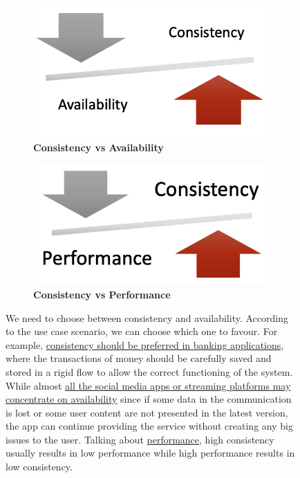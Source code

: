 \documentclass[10pt,a4paper]{article}
\begin{document}
\begin{figure}[h!]
\centering
\begin{subfigure}{.5\textwidth}
  \centering
  \includegraphics[width=.5\linewidth]{images/availability-vs-consistency}
  \caption{\textbf{Consistency vs Availability}}
  \label{fig:ca}
\end{subfigure}%
\begin{subfigure}{.5\textwidth}
  \centering
  \includegraphics[width=.5\linewidth]{images/performance-vs-consistency}
  \caption{\textbf{Consistency vs Performance}}
  \label{fig:cp}
\end{subfigure}
\caption{We need to choose between consistency and availability. According to the use case scenario, we can choose which one to favour. For example, \uline{consistency should be preferred in banking applications}, where the transactions of money should be carefully saved and stored in a rigid flow to allow the correct functioning of the system. While almost \uline{all the social media apps or streaming platforms may concentrate on availability} since if some data in the communication is lost or some user content are not presented in the latest version, the app can continue providing the service without creating any big issues to the user. Talking about \uline{performance}, high consistency usually results in low performance while high performance results in low consistency.}
\label{fig:cap}
\end{figure}
\end{document}
